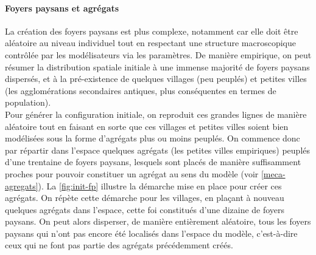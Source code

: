 \paragraph{Foyers paysans et agrégats}
La création des foyers paysans est plus complexe, notamment car elle doit être aléatoire au niveau individuel tout en respectant une structure macroscopique contrôlée par les modélisateurs via les paramètres.
De manière empirique, on peut résumer la distribution spatiale initiale à une immense majorité de foyers paysans dispersés, et à la pré-existence de quelques villages (peu peuplés) et petites villes (les agglomérations secondaires antiques, plus conséquentes en termes de population).\\
Pour générer la configuration initiale, on reproduit ces grandes lignes de manière aléatoire tout en faisant en sorte que ces villages et petites villes soient bien modélisées sous la forme d'agrégats plus ou moins peuplés.
On commence donc par répartir dans l'espace quelques agrégats (les \og petites villes\fg{} empiriques) peuplés d'une trentaine de foyers paysans, lesquels sont placés de manière suffisamment proches pour pouvoir constituer un agrégat au sens du modèle (voir \cref{meca-agregats}).
La \cref{fig:init-fp} illustre la démarche mise en place pour créer ces agrégats.
On répète cette démarche pour les \og villages\fg{}, en plaçant à nouveau quelques agrégats dans l'espace, cette foi constitués d'une dizaine de foyers paysans.
On peut alors disperser, de manière entièrement aléatoire, tous les foyers paysans qui n'ont pas encore été localisés dans l'espace du modèle, c'est-à-dire ceux qui ne font pas partie des agrégats précédemment créés.

